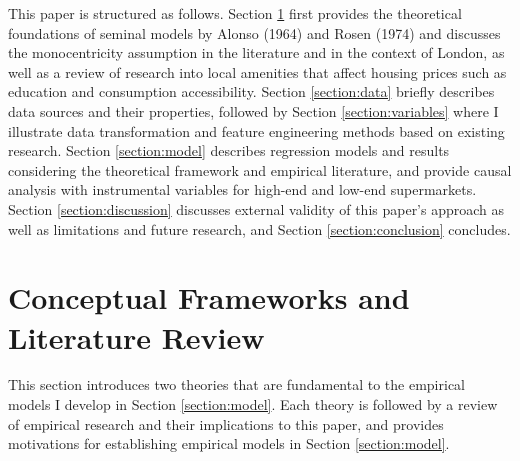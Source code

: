 \documentclass{article}
\begin{document}
This paper is structured as follows. Section \ref{section:lit} first provides the theoretical foundations of seminal models by Alonso (1964) and Rosen (1974) and discusses the monocentricity assumption in the literature and in the context of London, as well as a review of research into local amenities that affect housing prices such as education and consumption accessibility. Section \ref{section:data} briefly describes data sources and their properties, followed by Section \ref{section:variables} where I illustrate data transformation and feature engineering methods based on existing research. Section \ref{section:model} describes regression models and results considering the theoretical framework and empirical literature, and provide causal analysis with instrumental variables for high-end and low-end supermarkets. Section \ref{section:discussion} discusses external validity of this paper's approach as well as limitations and future research, and Section \ref{section:conclusion} concludes.

\section{Conceptual Frameworks and Literature Review} \label{section:lit}
This section introduces two theories that are fundamental to the empirical models I develop in Section \ref{section:model}. Each theory is followed by a review of empirical research and their implications to this paper, and provides motivations for establishing empirical models in Section \ref{section:model}.
\end{document}
